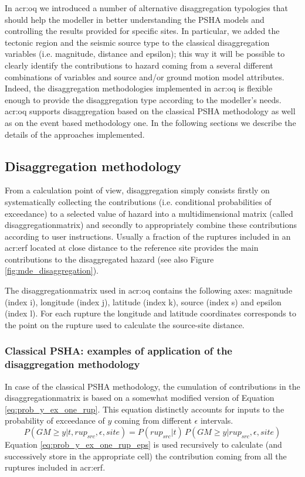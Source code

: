 In \gls{acr:oq} we introduced a number of alternative disaggregation 
typologies that should help the modeller in better understanding the 
PSHA models and controlling the results provided for specific sites.
% 
In particular, we added the tectonic region and the seismic source type 
to the classical disaggregation variables (i.e. magnitude, distance and
epsilon); this way it will be possible to clearly identify the 
contributions to hazard coming from a several different combinations 
of variables and source and/or ground motion model attributes.
%
Indeed, the disaggregation methodologies implemented in \gls{acr:oq} is 
flexible enough to provide the disaggregation type according to the 
modeller's needs.
% 
\gls{acr:oq} supports disaggregation based on the classical PSHA 
methodology as well as on the event based methodology one. In the 
following sections we describe the details of the approaches
implemented.
%
\subsection{Disaggregation methodology}
From a calculation point of view, disaggregation simply consists 
firstly on systematically collecting the contributions (i.e. conditional 
probabilities of exceedance) to a selected value of hazard into a 
multidimensional matrix (called \gls{disaggregationmatrix}) and secondly 
to appropriately combine these contributions according to user 
instructions.
Usually a fraction of the ruptures included 
in an \gls{acr:erf} located at close distance to the reference site
provides the main contributions to the disaggregated hazard (see also 
Figure \ref{fig:mde_disaggregation}).

The \gls{disaggregationmatrix} used in \gls{acr:oq} contains the
following axes: magnitude (index i), longitude (index j), latitude 
(index k), source (index s) and epsilon (index l).
%
For each rupture the longitude and latitude coordinates corresponds 
to the point on the rupture used to calculate the source-site distance.
%
\subsubsection{Classical PSHA: examples of application of the 
disaggregation methodology}
%
In case of the classical PSHA methodology, the cumulation of 
contributions in the \gls{disaggregationmatrix} is based on a 
somewhat modified version of Equation \ref{eq:prob_y_ex_one_rup}.
This equation distinctly accounts for inputs to the probability of 
exceedance of $y$ coming from different $\epsilon$ intervals.
%
\begin{equation}
P(GM \geq y|t,rup_{src},\epsilon,site) = 
	P(rup_{src}|t)\,
	P(GM\geq y|rup_{src},\epsilon,site)
\label{eq:prob_y_ex_one_rup_eps}
\end{equation}
%
Equation \ref{eq:prob_y_ex_one_rup_eps} is used recursively to 
calculate (and successively store in the appropriate cell) the 
contribution coming from all the ruptures included in 
\gls{acr:erf}. 
%
%
